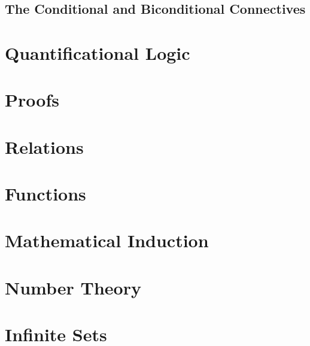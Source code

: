 \documentclass{report}
\begin{document}
\section{The Conditional and Biconditional Connectives}

\chapter{Quantificational Logic}

\chapter{Proofs}

\chapter{Relations}

\chapter{Functions}

\chapter{Mathematical Induction}

\chapter{Number Theory}

\chapter{Infinite Sets}
\end{document}
